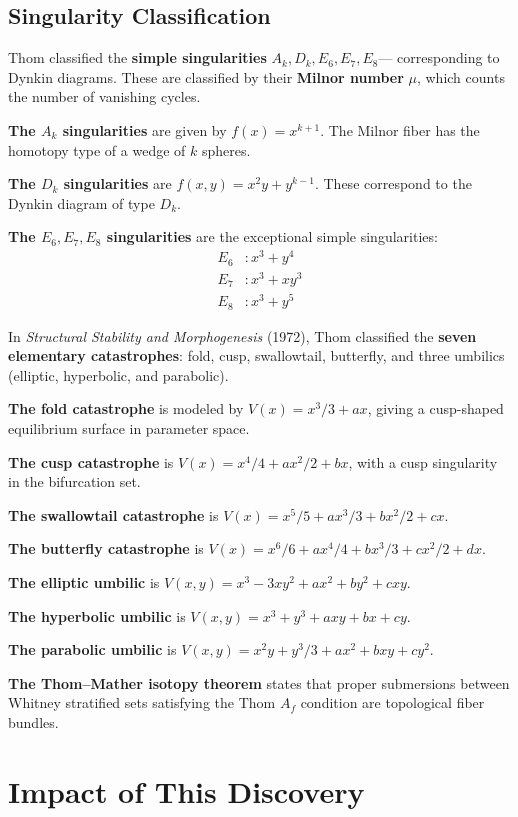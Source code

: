 \subsection{Singularity Classification}

Thom classified the \textbf{simple singularities} $A_k, D_k, E_6, E_7, E_8$---
corresponding to Dynkin diagrams. These are classified by their \textbf{Milnor
number} $\mu$, which counts the number of vanishing cycles.

\textbf{The $A_k$ singularities} are given by $f(x) = x^{k+1}$. The Milnor fiber
has the homotopy type of a wedge of $k$ spheres.

\textbf{The $D_k$ singularities} are $f(x,y) = x^2y + y^{k-1}$. These correspond
to the Dynkin diagram of type $D_k$.

\textbf{The $E_6, E_7, E_8$ singularities} are the exceptional simple
singularities:
\begin{align*}
E_6 &: x^3 + y^4 \\
E_7 &: x^3 + xy^3 \\
E_8 &: x^3 + y^5
\end{align*}

In \emph{Structural Stability and Morphogenesis} (1972), Thom classified the
\textbf{seven elementary catastrophes}: fold, cusp, swallowtail, butterfly, and
three umbilics (elliptic, hyperbolic, and parabolic).

\textbf{The fold catastrophe} is modeled by $V(x) = x^3/3 + ax$, giving a
cusp-shaped equilibrium surface in parameter space.

\textbf{The cusp catastrophe} is $V(x) = x^4/4 + ax^2/2 + bx$, with a cusp
singularity in the bifurcation set.

\textbf{The swallowtail catastrophe} is $V(x) = x^5/5 + ax^3/3 + bx^2/2 + cx$.

\textbf{The butterfly catastrophe} is $V(x) = x^6/6 + ax^4/4 + bx^3/3 + cx^2/2 +
dx$.

\textbf{The elliptic umbilic} is $V(x,y) = x^3 - 3xy^2 + ax^2 + by^2 + cxy$.

\textbf{The hyperbolic umbilic} is $V(x,y) = x^3 + y^3 + axy + bx + cy$.

\textbf{The parabolic umbilic} is $V(x,y) = x^2y + y^3/3 + ax^2 + bxy + cy^2$.

\textbf{The Thom--Mather isotopy theorem} states that proper submersions between
Whitney stratified sets satisfying the Thom $A_f$ condition are topological fiber
bundles.

\section{Impact of This Discovery}

